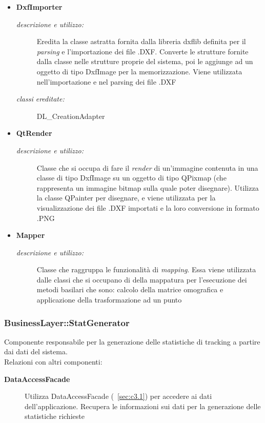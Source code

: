 \begin{itemize}
\begin{description}
\end{description}
\item \textbf{DxfImporter}
\begin{description}
\item [\textit{descrizione e utilizzo:}] Eredita la classe astratta fornita dalla libreria dxflib definita per il \textit{parsing} e l'importazione dei file .DXF. Converte le strutture fornite dalla classe nelle strutture proprie del sistema, poi le aggiunge ad un oggetto di tipo DxfImage per la memorizzazione. Viene utilizzata nell'importazione e nel parsing dei file .DXF
\item [\textit{classi ereditate:}] DL_CreationAdapter
\end{description}
\item \textbf{QtRender}
\begin{description}
\item [\textit{descrizione e utilizzo:}] Classe che si occupa di fare il \textit{render} di un'immagine contenuta in una classe di tipo DxfImage su un oggetto di tipo QPixmap (che rappresenta un immagine bitmap sulla quale poter disegnare). Utilizza la classe QPainter per disegnare, e viene utilizzata per la visualizzazione dei file .DXF importati e la loro conversione in formato .PNG
\end{description}
\item \textbf{Mapper}
\begin{description}
\item [\textit{descrizione e utilizzo:}] Classe che raggruppa le funzionalità di \textit{mapping}. Essa viene utilizzata dalle classi che si occupano di della mappatura per l'esecuzione dei metodi basilari che  sono: calcolo della matrice omografica e applicazione della trasformazione ad un punto
\end{description}
\end{itemize}

\subsubsection{BusinessLayer::StatGenerator} \label{sec:c2.3}
Componente responsabile per la generazione delle statistiche di tracking a partire dai dati del sistema. \\
Relazioni con altri componenti: 
\begin{description} 
\item [\textbf{DataAccessFacade}]
Utilizza DataAccessFacade (~\ref{sec:c3.1}) per accedere ai dati dell'applicazione. Recupera le informazioni sui dati per la generazione delle statistiche richieste 
\end{description} 

